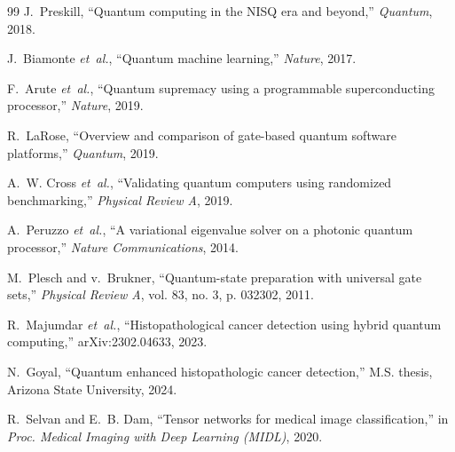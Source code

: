 \documentclass[conference]{IEEEtran}
\begin{document}
\begin{thebibliography}{99}
J.~Preskill, ``Quantum computing in the NISQ era and beyond,'' \emph{Quantum}, 2018.

J.~Biamonte \emph{et~al.}, ``Quantum machine learning,'' \emph{Nature}, 2017.

F.~Arute \emph{et~al.}, ``Quantum supremacy using a programmable superconducting processor,'' \emph{Nature}, 2019.

R.~LaRose, ``Overview and comparison of gate-based quantum software platforms,'' \emph{Quantum}, 2019.

A.~W. Cross \emph{et~al.}, ``Validating quantum computers using randomized benchmarking,'' \emph{Physical Review A}, 2019.

A.~Peruzzo \emph{et~al.}, ``A variational eigenvalue solver on a photonic quantum processor,'' \emph{Nature Communications}, 2014.

M.~Plesch and v.~Brukner, ``Quantum-state preparation with universal gate sets,'' \emph{Physical Review A}, vol. 83, no. 3, p. 032302, 2011.

R.~Majumdar \emph{et~al.}, ``Histopathological cancer detection using hybrid quantum computing,'' arXiv:2302.04633, 2023.

N.~Goyal, ``Quantum enhanced histopathologic cancer detection,'' M.S. thesis, Arizona State University, 2024.

R.~Selvan and E.~B. Dam, ``Tensor networks for medical image classification,'' in \emph{Proc. Medical Imaging with Deep Learning (MIDL)}, 2020.

\end{thebibliography}
\end{document}
